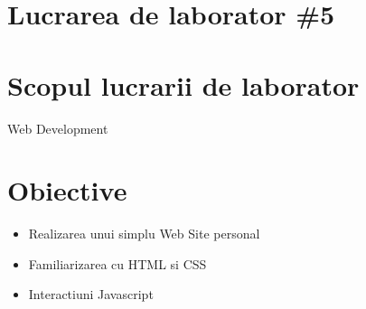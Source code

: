 \section*{Lucrarea de laborator \#5}

\section{Scopul lucrarii de laborator}
Web Development\\
\section{Obiective}
\begin{itemize}
\item Realizarea unui simplu Web Site personal
\item Familiarizarea cu HTML si CSS
\item Interactiuni Javascript
\end{itemize}
\clearpage